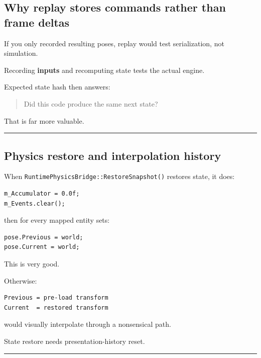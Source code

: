 \subsection{Why replay stores commands rather than frame deltas}\label{06-engine-ii-ch038-why-replay-stores-commands-rather-than-frame-deltas}

If you only recorded resulting poses, replay would test serialization, not simulation.

Recording \textbf{inputs} and recomputing state tests the actual engine.

Expected state hash then answers:

\begin{quote}
Did this code produce the same next state?
\end{quote}

That is far more valuable.

\begin{center}\rule{0.5\linewidth}{0.5pt}\end{center}

\subsection{Physics restore and interpolation history}\label{06-engine-ii-ch038-physics-restore-and-interpolation-history}

When \texttt{RuntimePhysicsBridge::RestoreSnapshot()} restores state, it does:

\begin{verbatim}
m_Accumulator = 0.0f;
m_Events.clear();
\end{verbatim}

then for every mapped entity sets:

\begin{verbatim}
pose.Previous = world;
pose.Current = world;
\end{verbatim}

This is very good.

Otherwise:

\begin{verbatim}
Previous = pre-load transform
Current  = restored transform
\end{verbatim}

would visually interpolate through a nonsensical path.

State restore needs presentation-history reset.

\begin{center}\rule{0.5\linewidth}{0.5pt}\end{center}

